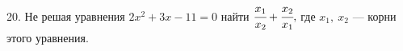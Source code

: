 20. Не решая уравнения $2x^2+3x-11=0$ найти $\cfrac{x_1}{x_2}+\cfrac{x_2}{x_1},$ где $x_1,\ x_2$ --- корни этого уравнения.\\
